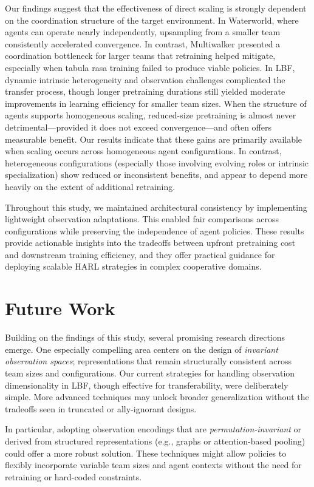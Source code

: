 \documentclass{article}
\begin{document}
Our findings suggest that the effectiveness of direct scaling is strongly dependent on 
the coordination structure of the target environment. In Waterworld, where agents can operate 
nearly independently, upsampling from a smaller team consistently accelerated convergence. 
In contrast, Multiwalker presented a coordination bottleneck for larger teams that retraining 
helped mitigate, especially when tabula rasa training failed to produce viable policies. 
In LBF, dynamic intrinsic heterogeneity and observation challenges complicated the 
transfer process, though longer pretraining durations still yielded moderate 
improvements in learning efficiency for smaller team sizes.
When the structure of agents supports homogeneous scaling, reduced-size pretraining is almost 
never detrimental—provided it does not exceed convergence—and often offers measurable benefit. 
Our results indicate that these gains are primarily available when scaling occurs across 
homogeneous agent configurations. In contrast, heterogeneous configurations (especially those 
involving evolving roles or intrinsic specialization) show reduced or inconsistent benefits, 
and appear to depend more heavily on the extent of additional retraining.

Throughout this study, we maintained architectural consistency by implementing 
lightweight observation adaptations. This enabled fair comparisons across configurations 
while preserving the independence of agent policies. These results provide actionable 
insights into the tradeoffs between upfront pretraining cost and downstream training efficiency, 
and they offer practical guidance for deploying scalable HARL strategies in complex 
cooperative domains.


\section{Future Work}
Building on the findings of this study, several promising research directions emerge. 
One especially compelling area centers on the design of \emph{invariant observation spaces};
representations that remain structurally consistent across team sizes and configurations. 
Our current strategies for handling observation dimensionality in LBF, 
though effective for transferability, were deliberately simple. More advanced techniques may 
unlock broader generalization without the tradeoffs seen in truncated or ally-ignorant designs.

In particular, adopting observation encodings that are \emph{permutation-invariant} or derived 
from structured representations (e.g., graphs or attention-based pooling) 
could offer a more robust solution. These techniques might allow policies to flexibly 
incorporate variable team sizes and agent contexts without the need for retraining or 
hard-coded constraints.
\end{document}
